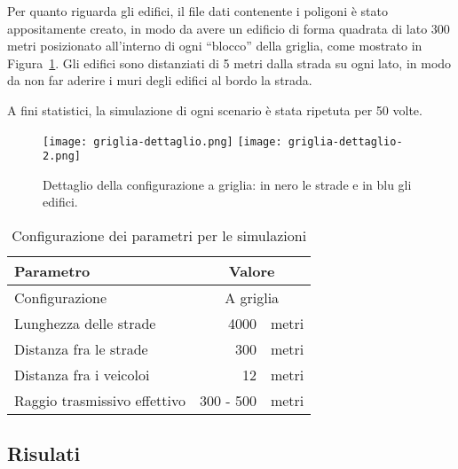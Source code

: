 Per quanto riguarda gli edifici, il file dati contenente i poligoni è stato appositamente creato, in modo da avere un edificio di forma quadrata di lato 300 metri
posizionato all'interno di ogni ``blocco'' della griglia, come mostrato in Figura~\ref{fig:griglia-dettaglio}.
Gli edifici sono distanziati di 5 metri dalla strada su ogni lato, in modo da non far aderire i muri degli edifici al bordo la strada.

A fini statistici, la simulazione di ogni scenario è stata ripetuta per 50 volte. %
\begin{figure}[!h]
	\centering
	\begin{center}
		\texttt{[image: griglia-dettaglio.png]}	%
		\hspace{8pt}
		\texttt{[image: griglia-dettaglio-2.png]}
	\end{center}
	\label{fig:griglia-dettaglio}\caption{Dettaglio della configurazione a griglia: in nero le strade e in blu gli edifici.}
\end{figure}
%
\begin{table}[!h]
	\begin{center}
	  \begin{tabular}{ | m{.5\linewidth} | r  c | }
			\hline
			Parametro											&			\multicolumn{2}{c|}{Valore}			\\ \hline \hline
			Configurazione								&			\multicolumn{2}{c|}{A griglia}		\\ \hline
			Lunghezza delle strade				&			4000 								& metri		\\ \hline
			Distanza fra le strade				&			300 								& metri		\\ \hline
			Distanza fra i veicoloi 			&			12 									& metri		\\ \hline
			Raggio trasmissivo effettivo	&			300 - 500						& metri		\\
			\hline
	  \end{tabular}
	\end{center}
	\caption{Configurazione dei parametri per le simulazioni}
	\label{tab:parametri-simulazioni-barichello}
\end{table}
%
\subsection{Risulati}
%
